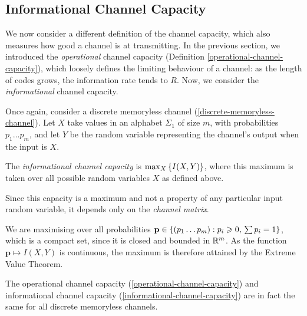 \documentclass{article}
\begin{document}

\subsection{Informational Channel Capacity}

We now consider a different definition of the channel capacity,
which also measures how good a channel is at transmitting.
In the previous section, we introduced the \textit{operational} channel capacity
(Definition \ref{operational-channel-capacity}),
which loosely defines the limiting behaviour of a channel:
as the length of codes grows, the information rate tends to $R$.
Now, we consider the \textit{informational} channel capacity.

\begin{definition}
	\label{informational-channel-capacity}
	Once again, consider a discrete memoryless channel
	(\ref{discrete-memoryless-channel}).
	Let $X$ take values in an alphabet $\Sigma_1$ of size $m$,
	with probabilities $p_1 \dots p_m$,
	and let $Y$ be the random variable
	representing the channel's output when the input is $X$.
	
    The \textit{informational channel capacity} is $\max_X \left\lbrace I(X, Y) \right\rbrace$, where
    this maximum is taken over all possible random variables $X$ as defined above.
\end{definition}

\begin{note}
	Since this capacity is a maximum
	and not a property of any particular input random variable,
	it depends only on the \textit{channel matrix}.
\end{note}

\begin{note}
	We are maximising over all probabilities
	$\mathbf p \in \left\lbrace (p_1 \dots p_m) : p_i \geqslant 0, \, \sum p_i = 1 \right\rbrace$,
	which is a compact set, since it is closed and bounded in $\mathbb{R}^m$.
	As the function $\mathbf p \mapsto I(X, Y)$ is continuous,
	the maximum is therefore attained by the Extreme Value Theorem.
\end{note}

\begin{theorem}
	\label{shannon-noisy-coding-theorem}
    The operational channel capacity (\ref{operational-channel-capacity})
    and informational channel capacity (\ref{informational-channel-capacity})
    are in fact the same for all discrete memoryless channels.
\end{theorem}
\end{document}
